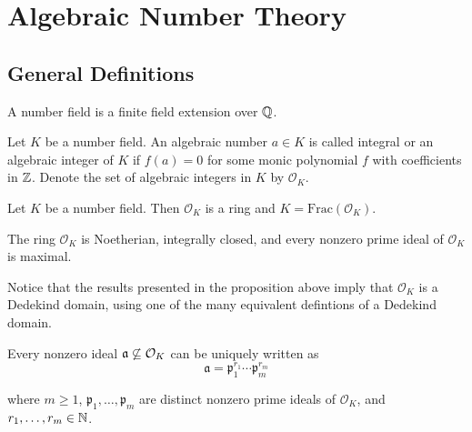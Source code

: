 \setchapterpreamble[u]{\margintoc}
\chapter{Algebraic Number Theory}

\section{General Definitions}

\begin{definition}
    A number field is a finite field extension over $\mathbb{Q}$.
\end{definition}

\begin{definition}
    Let $K$ be a number field. An algebraic number $a \in K$ is called integral or an algebraic integer of $K$ if $f(a) = 0$ for some monic polynomial $f$ with coefficients in $\mathbb{Z}$. Denote the set of algebraic integers in $K$ by $\mathcal{O}_{K}$.
\end{definition}


\begin{proposition}
    Let $K$ be a number field. Then $\mathcal{O}_{K}$ is a ring and $K = \textrm{Frac}(\mathcal{O}_{K})$.
\end{proposition}

\begin{proposition}
    The ring $\mathcal{O}_{K}$ is Noetherian, integrally closed, and every nonzero prime ideal of $\mathcal{O}_{K}$ is maximal.
\end{proposition}

Notice that the results presented in the proposition above imply that $\mathcal{O}_{K}$ is a Dedekind domain, using one of the many equivalent defintions of a Dedekind domain.

\begin{theorem}
    Every nonzero ideal $\mathfrak{a} \not\subseteq \mathcal{O}_{K}$ can be uniquely written as
        \[\mathfrak{a} = \mathfrak{p}_1^{r_1}\cdots \mathfrak{p}_m^{r_m}\]

    where $m \geq 1$, $\mathfrak{p}_1,\ldots, \mathfrak{p}_m$ are distinct nonzero prime ideals of $\mathcal{O}_{K}$, and $r_1, \ldots, r_m \in \mathbb{N}$.
\end{theorem}

